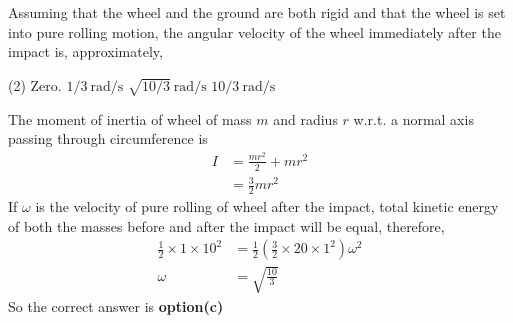\begin{enumerate}[label=\color{ocre}\textbf{\arabic*.}]
\begin{figure}[H]
\end{figure}
 Assuming that the wheel and the ground are both rigid and that the wheel is set into pure rolling motion, the angular velocity of the wheel immediately after the impact is, approximately,
 \begin{tasks}(2)
 	\task[\textbf{a.}]Zero. 
 	\task[\textbf{b.}]$1 / 3 \ \mathrm{rad} / \mathrm{s}$
 	\task[\textbf{c.}]$\sqrt{10 / 3}\  \mathrm{rad} / \mathrm{s}$ 
 	\task[\textbf{d.}]$10 / 3 \ \mathrm{rad} / \mathrm{s}$   
 \end{tasks}
\begin{answer}
	The moment of inertia of wheel of mass $m$ and radius $r$ w.r.t. a normal axis passing through circumference is
	\begin{align*}
	I &=\frac{m r^{2}}{2}+m r^{2} \\
	&=\frac{3}{2} m r^{2}
	\end{align*}
	If $\omega$ is the velocity of pure rolling of wheel after the impact, total kinetic energy of both the masses before and after the impact will be equal, therefore,
	\begin{align*}
	\frac{1}{2} \times 1 \times 10^{2} &=\frac{1}{2}\left(\frac{3}{2} \times 20 \times 1^{2}\right) \omega^{2} \\
	\omega &=\sqrt{\frac{10}{3}}
	\end{align*}
	So the correct answer is \textbf{option(c)}
\end{answer}
\end{enumerate}



